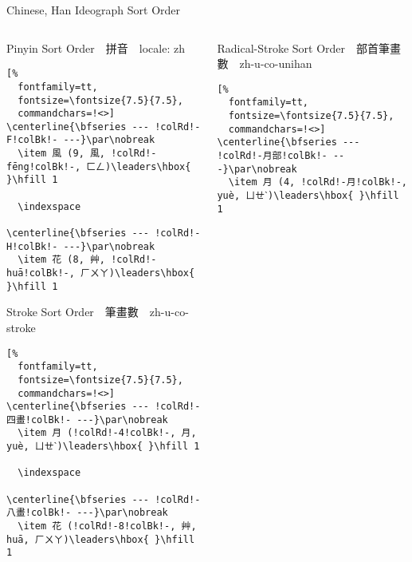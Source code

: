 \documentclass[aspectratio=169,10pt]{beamer}
\begin{document}
\begin{frame}[fragile]{Chinese, Han Ideograph Sort Order}
\begin{columns}
\begin{column}{73mm}
\begin{exampleblock}{Pinyin {\footnotesize Sort Order~~拼音~~\scriptsize locale: zh}}
\makeatletter
\def\verbatim@font{\fontsize{7.5}{7.5}\selectfont\textjapanese}
\makeatother
\begin{Verbatim}[%
  fontfamily=tt,
  fontsize=\fontsize{7.5}{7.5},
  commandchars=!<>]
\centerline{\bfseries --- !colRd!-F!colBk!- ---}\par\nobreak
  \item 風 (9, 風, !colRd!-fēng!colBk!-, ㄈㄥ)\leaders\hbox{ }\hfill 1

  \indexspace

\centerline{\bfseries --- !colRd!-H!colBk!- ---}\par\nobreak
  \item 花 (8, 艸, !colRd!-huā!colBk!-, ㄏㄨㄚ)\leaders\hbox{ }\hfill 1
\end{Verbatim}
\end{exampleblock}
\begin{exampleblock}{Stroke {\footnotesize Sort Order~~筆畫數~~\scriptsize zh-u-co-stroke}}
\makeatletter
\def\verbatim@font{\fontsize{7.5}{7.5}\selectfont\textjapanese}
\makeatother
\begin{Verbatim}[%
  fontfamily=tt,
  fontsize=\fontsize{7.5}{7.5},
  commandchars=!<>]
\centerline{\bfseries --- !colRd!-四畫!colBk!- ---}\par\nobreak
  \item 月 (!colRd!-4!colBk!-, 月, yuè, ㄩㄝˋ)\leaders\hbox{ }\hfill 1

  \indexspace

\centerline{\bfseries --- !colRd!-八畫!colBk!- ---}\par\nobreak
  \item 花 (!colRd!-8!colBk!-, 艸, huā, ㄏㄨㄚ)\leaders\hbox{ }\hfill 1
\end{Verbatim}
\end{exampleblock}
\end{column}
\begin{column}{73mm}
\begin{exampleblock}{Radical-Stroke {\footnotesize Sort Order~~部首筆畫數~~\scriptsize zh-u-co-unihan}}
\begin{Verbatim}[%
  fontfamily=tt,
  fontsize=\fontsize{7.5}{7.5},
  commandchars=!<>]
\centerline{\bfseries --- !colRd!-月部!colBk!- ---}\par\nobreak
  \item 月 (4, !colRd!-月!colBk!-, yuè, ㄩㄝˋ)\leaders\hbox{ }\hfill 1


\end{Verbatim}
\end{exampleblock}
\end{column}
\end{columns}
\end{frame}
\end{document}
